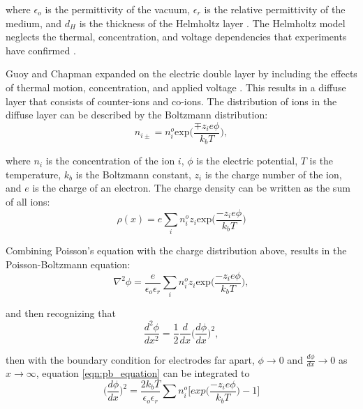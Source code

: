 \noindent where $\epsilon_o$ is the permittivity of the vacuum, $\epsilon_r$ is the relative permittivity of the medium, and $d_H$ is the thickness of the Helmholtz layer \cite{_gongadze.pdf_????}. The Helmholtz model neglects the thermal, concentration, and voltage dependencies that experiments have confirmed \cite{_jes2011.pdf_????}.

\par Guoy and Chapman expanded on the electric double layer by including the effects of thermal motion, concentration, and applied voltage \cite{chapman_li._1913,_gongadze.pdf_????}. This results in a diffuse layer that consists of counter-ions and co-ions. The distribution of ions in the diffuse layer can be described by the Boltzmann distribution:
\begin{equation}
    n_{i\pm} = n_i^o \text{exp}\Big(\frac{ \mp z_i e\phi}{k_b T}\Big),
\end{equation}

\noindent where $n_i$ is the concentration of the ion $i$, $\phi$ is the electric potential, $T$ is the temperature, $k_b$ is the Boltzmann constant, $z_i$ is the charge number of the ion, and $e$ is the charge of an electron. The charge density can be written as the sum of all ions:
\begin{equation}
    \rho(x) = e \sum_i n_i^o z_i \text{exp}\Big(\frac{-z_i e\phi}{k_b T}\Big)
\end{equation}

\par Combining Poisson's equation with the charge distribution above, results in the Poisson-Boltzmann equation:
\begin{equation}
    \nabla^2\phi = \frac{e}{\epsilon_o\epsilon_r} \sum_i n_i^o z_i \text{exp}\Big(\frac{-z_i e \phi}{k_b T}\Big),
    \label{eqn:pb_equation}
\end{equation}

\noindent and then recognizing that
\begin{equation}
    \frac{d^2\phi}{dx^2} = \frac{1}{2}\frac{d}{dx}\Big(\frac{d\phi}{dx}\Big)^2,
\end{equation}

\noindent then with the boundary condition for electrodes far apart, $\phi\to0$ and $\frac{d\phi}{dx}\to 0$ as $x\to\infty$, equation \ref{eqn:pb_equation} can be integrated to
\begin{equation}
    \Big(\frac{d\phi}{dx}\Big)^2 = \frac{2k_b T}{\epsilon_o\epsilon_r} \sum n_i^o \bigg[exp\Big(\frac{-z_i e\phi}{k_b T}\Big) - 1\bigg] 
\end{equation}

